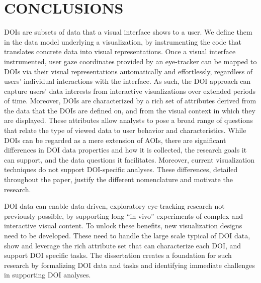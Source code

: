 \chapter{CONCLUSIONS}
\label{chap:Conclusion}
DOIs are subsets of data that a visual interface shows to a user. We define them in the data model underlying a visualization, by instrumenting the code that translates concrete data into visual representations. Once a visual interface instrumented, user gaze coordinates provided by an eye-tracker can be mapped to DOIs via their visual representations automatically and effortlessly, regardless of users' individual interactions with the interface. As such, the DOI approach can capture users' data interests from interactive visualizations over extended periods of time. Moreover, DOIs are characterized by a rich set of attributes derived from the data that the DOIs are defined on, and from the visual context in which they are displayed. These attributes allow analysts to pose a broad range of questions that relate the type of viewed data to user behavior and characteristics. While DOIs can be regarded as a mere extension of AOIs, there are significant differences in DOI data properties and how it is collected, the research goals it can support, and the data questions it facilitates. Moreover, current visualization techniques do not support DOI-specific analyses. These differences, detailed throughout the paper, justify the different nomenclature and motivate the research.    

DOI data can enable data-driven, exploratory eye-tracking research not previously possible, by supporting long ``in vivo'' experiments of complex and interactive visual content. To unlock these benefits, new visualization designs need to be developed. These need to handle the large scale typical of DOI data, show and leverage the rich attribute set that can characterize each DOI, and support DOI specific tasks. The dissertation creates a foundation for such research by formalizing DOI data and tasks and identifying immediate challenges in supporting DOI analyses.